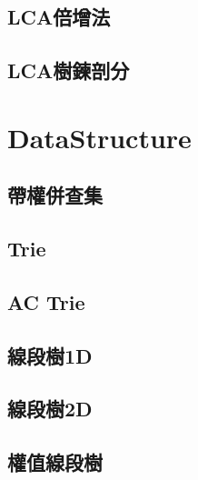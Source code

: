     \subsection{LCA倍增法}
    \subsection{LCA樹鍊剖分}
        

\section{DataStructure}
    \subsection{帶權併查集}
    \subsection{Trie}
    \subsection{AC Trie}
    \subsection{線段樹1D}
    \subsection{線段樹2D}
    \subsection{權值線段樹}
